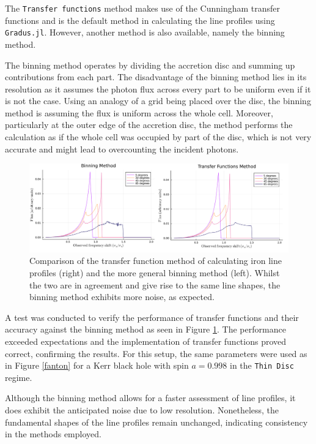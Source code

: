 \documentclass[fleqn,usenatbib,useAMS]{mnras}
\begin{document}
The {\tt Transfer functions} method makes use of the Cunningham transfer functions \cite{cunningham1975effects} and is the default method in calculating the line profiles using {\tt Gradus.jl}. However, another method is also available, namely the binning method. 

The binning method operates by dividing the accretion disc and summing up contributions from each part. The disadvantage of the binning method lies in its resolution as it assumes the photon flux across every part to be uniform even if it is not the case. Using an analogy of a grid being placed over the disc, the binning method is assuming the flux is uniform across the whole cell. Moreover, particularly at the outer edge of the accretion disc, the method performs the calculation as if the whole cell was occupied by part of the disc, which is not very accurate and might lead to overcounting the incident photons.


\begin{figure}
    \centering
    \includegraphics[width=0.98\linewidth]{figures/comparison.png}
    \caption{Comparison of the transfer function method of calculating iron line profiles (right) and the more general binning method (left). Whilst the two are in agreement and give rise to the same line shapes, the binning method exhibits more noise, as expected.}
    \label{comparison}
\end{figure}

A test was conducted to verify the performance of transfer functions and their accuracy against the binning method as seen in Figure \ref{comparison}. The performance exceeded expectations and the implementation of transfer functions proved correct, confirming the results. For this setup, the same parameters were used as in Figure \ref{fanton} for a Kerr black hole with spin $a = 0.998$ in the {\tt Thin Disc} regime. 

Although the binning method allows for a faster assessment of line profiles, it does exhibit the anticipated noise due to low resolution. Nonetheless, the fundamental shapes of the line profiles remain unchanged, indicating consistency in the methods employed.
\end{document}

